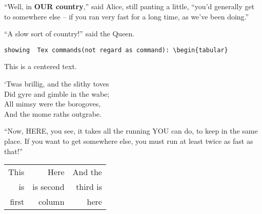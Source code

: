 \documentclass[12pt,fullpage]{article}
\begin{document}
``Well, in {\bf OUR country},'' said Alice, still panting 
a little, ``you'd generally get to somewhere else -- if
you ran very fast for a long time, as 
we've been doing.''


``A slow sort of country!'' said the Queen.

\verb,showing  Tex commands(not regard as command): \begin{tabular},

\begin{center}
This is a centered text.
\end{center}

\iffalse
multiple line comment
\fi

`Twas brillig, and the slithy toves \\
     Did gyre and gimble in the wabe; \\
     All mimsy were the borogoves, \\
     And the mome raths outgrabe.

``Now, HERE, you see, it takes all the 
running YOU can do, to keep in the same
place.  If you want to get somewhere else,
you must run at least twice as fast as that!''

 \begin{tabular}{rrr}
   This & Here & And the \\
   is & is second & third is \\
   first & column & here \\
   \end{tabular}
\end{document}
